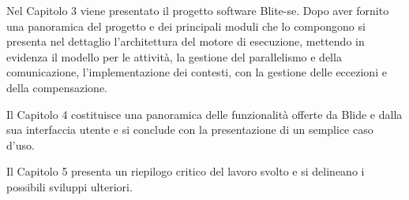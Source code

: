 Nel Capitolo 3 viene presentato il progetto software Blite-se. Dopo aver
fornito una panoramica del progetto e dei principali moduli che lo compongono si
presenta nel dettaglio l'architettura del motore di esecuzione, mettendo in
evidenza il modello per le attività, la gestione del parallelismo e della
comunicazione, l'implementazione dei contesti, con la gestione delle
eccezioni e della compensazione.

Il Capitolo 4 costituisce una panoramica delle funzionalità offerte da Blide e
dalla sua interfaccia utente e si conclude con la presentazione di un semplice
caso d'uso. 

Il Capitolo 5 presenta un riepilogo critico del lavoro svolto e si delineano i
possibili sviluppi ulteriori.
